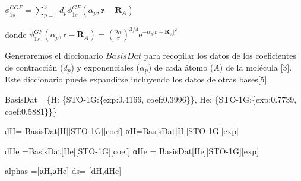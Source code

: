 \documentclass[
  letterpaper,
  DIV=11,
  numbers=noendperiod]{scrreprt}
\newenvironment{Shaded}{\begin{snugshade}}{\end{snugshade}}
\newcommand{\FloatTok}[1]{\textcolor[rgb]{0.68,0.00,0.00}{#1}}
\newcommand{\NormalTok}[1]{\textcolor[rgb]{0.00,0.23,0.31}{#1}}
\newcommand{\OperatorTok}[1]{\textcolor[rgb]{0.37,0.37,0.37}{#1}}
\newcommand{\StringTok}[1]{\textcolor[rgb]{0.13,0.47,0.30}{#1}}
\begin{document}
\(\phi^{CGF}_{1s}= \sum^3_{p=1} d_p \phi^{GF}_{1s}(\alpha_p, \textbf{r}-\textbf{R}_A )\)

donde
\(\phi^{GF}_{1s}(\alpha_p, \textbf{r}-\textbf{R}_A ) = \left( \frac{2 \alpha}{\pi} \right)^{3/4} \mathrm{e}^{-\alpha_p|\textbf{r}-\textbf{R}_A|^2}\)

Generaremos el diccionario \(BasisDat\) para recopilar los datos de los
coeficientes de contracción (\(d_p\)) y exponenciales (\(\alpha_p\)) de
cada átomo (\(A\)) de la molécula {[}3{]}. Este diccionario puede
expandirse incluyendo los datos de otras bases{[}5{]}.

\begin{Shaded}
\begin{Highlighting}[]
\NormalTok{BasisDat}\OperatorTok{=}\NormalTok{ \{}\StringTok{\textquotesingle{}H\textquotesingle{}}\NormalTok{: \{}\StringTok{\textquotesingle{}STO{-}1G\textquotesingle{}}\NormalTok{:\{}\StringTok{\textquotesingle{}exp\textquotesingle{}}\NormalTok{:}\FloatTok{0.4166}\NormalTok{,}
                           \StringTok{\textquotesingle{}coef\textquotesingle{}}\NormalTok{:}\FloatTok{0.3996}\NormalTok{\}\},               }
          \StringTok{\textquotesingle{}He\textquotesingle{}}\NormalTok{: \{}\StringTok{\textquotesingle{}STO{-}1G\textquotesingle{}}\NormalTok{:\{}\StringTok{\textquotesingle{}exp\textquotesingle{}}\NormalTok{:}\FloatTok{0.7739}\NormalTok{,}
                           \StringTok{\textquotesingle{}coef\textquotesingle{}}\NormalTok{:}\FloatTok{0.5881}\NormalTok{\}\}\}}

\NormalTok{dH}\OperatorTok{=}\NormalTok{ BasisDat[}\StringTok{\textquotesingle{}H\textquotesingle{}}\NormalTok{][}\StringTok{\textquotesingle{}STO{-}1G\textquotesingle{}}\NormalTok{][}\StringTok{\textquotesingle{}coef\textquotesingle{}}\NormalTok{]}
\NormalTok{αH}\OperatorTok{=}\NormalTok{BasisDat[}\StringTok{\textquotesingle{}H\textquotesingle{}}\NormalTok{][}\StringTok{\textquotesingle{}STO{-}1G\textquotesingle{}}\NormalTok{][}\StringTok{\textquotesingle{}exp\textquotesingle{}}\NormalTok{]}

\NormalTok{dHe }\OperatorTok{=}\NormalTok{BasisDat[}\StringTok{\textquotesingle{}He\textquotesingle{}}\NormalTok{][}\StringTok{\textquotesingle{}STO{-}1G\textquotesingle{}}\NormalTok{][}\StringTok{\textquotesingle{}coef\textquotesingle{}}\NormalTok{]}
\NormalTok{αHe }\OperatorTok{=}\NormalTok{ BasisDat[}\StringTok{\textquotesingle{}He\textquotesingle{}}\NormalTok{][}\StringTok{\textquotesingle{}STO{-}1G\textquotesingle{}}\NormalTok{][}\StringTok{\textquotesingle{}exp\textquotesingle{}}\NormalTok{]}

\NormalTok{alphas }\OperatorTok{=}\NormalTok{[αH,αHe]}
\NormalTok{ds}\OperatorTok{=}\NormalTok{ [dH,dHe]}
\end{Highlighting}
\end{Shaded}
\end{document}

